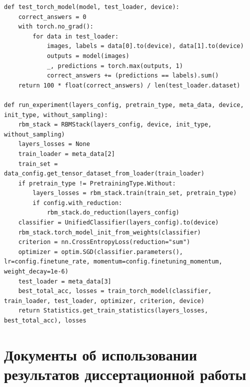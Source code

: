 \begin{lstlisting}[style=PythonStyle]
def test_torch_model(model, test_loader, device):
    correct_answers = 0
    with torch.no_grad():
        for data in test_loader:
            images, labels = data[0].to(device), data[1].to(device)
            outputs = model(images)
            _, predictions = torch.max(outputs, 1)
            correct_answers += (predictions == labels).sum()
    return 100 * float(correct_answers) / len(test_loader.dataset)

def run_experiment(layers_config, pretrain_type, meta_data, device, init_type, without_sampling):
    rbm_stack = RBMStack(layers_config, device, init_type, without_sampling)
    layers_losses = None
    train_loader = meta_data[2]
    train_set = data_config.get_tensor_dataset_from_loader(train_loader)
    if pretrain_type != PretrainingType.Without:
        layers_losses = rbm_stack.train(train_set, pretrain_type)
        if config.with_reduction:
            rbm_stack.do_reduction(layers_config)
    classifier = UnifiedClassifier(layers_config).to(device)
    rbm_stack.torch_model_init_from_weights(classifier)
    criterion = nn.CrossEntropyLoss(reduction="sum")
    optimizer = optim.SGD(classifier.parameters(), lr=config.finetune_rate, momentum=config.finetuning_momentum, weight_decay=1e-6)
    test_loader = meta_data[3]
    best_total_acc, losses = train_torch_model(classifier, train_loader, test_loader, optimizer, criterion, device)
    return Statistics.get_train_statistics(layers_losses, best_total_acc), losses
\end{lstlisting}

\chapter{Документы об использовании результатов диссертационной работы}
\label{app:b}

